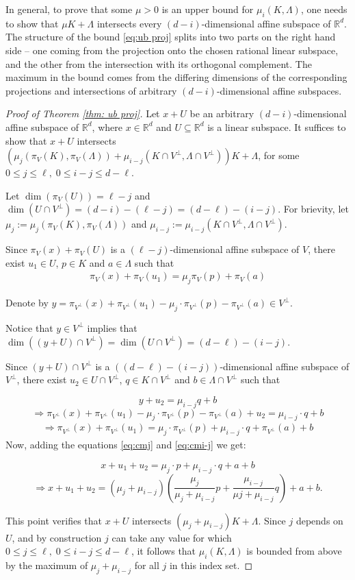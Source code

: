 \documentclass{amsart}
\theoremstyle{definition}
\theoremstyle{remark}
\newcommand{\R}{\mathbb{R}}
\begin{document}
In general, to prove that some $\mu>0$ is an upper bound for $\mu_i(K,\Lambda)$, one needs to show that $\mu K + \Lambda$ intersects every $(d-i)$-dimensional affine subspace of $\R^d$. The structure of the bound \eqref{eq:ub proj} splits into two parts on the right hand side -- one coming from the projection onto the chosen rational linear subspace, and the other from the intersection with its orthogonal complement.  The maximum in the bound comes from the differing dimensions of the corresponding projections and intersections of arbitrary $(d-i)$-dimensional affine subspaces.
\begin{proof}[Proof of Theorem \ref{thm: ub proj}]
Let $x+U$ be an arbitrary $(d-i)$-dimensional affine subspace of $\R^d$, where $x\in \R^d$ and $U\subseteq \R^d$ is a linear subspace. It suffices to show that $x+U$ intersects $(\mu_j(\pi_V(K), \pi_V(\Lambda))+ \mu_{i-j}(K\cap V^\perp, \Lambda \cap V^\perp))K + \Lambda $, for some $0 \le j \le \ell,\; 0 \le i-j \le d-\ell$.

Let $\dim(\pi_V(U))=\ell-j$ and $\dim(U\cap V^\perp)=(d-i)-(\ell-j)=(d-\ell)-(i-j)$. For brievity, let $\mu_j:=\mu_j(\pi_V(K),\pi_V(\Lambda))$ and $\mu_{i-j}:=\mu_{i-j}(K\cap V^\perp, \Lambda \cap V^\perp)$.

Since $\pi_V(x)+\pi_V(U)$ is a $(\ell-j)$-dimensional affine subspace of $V$, there exist $u_1\in U$, $p\in K$ and $a\in \Lambda$ such that 
\begin{align}\label{eq:cmj}
\pi_V(x)+\pi_V(u_1)=\mu_j \pi_V(p)+\pi_V(a)
\end{align}

Denote by $y=\pi_{V^\perp}(x)+\pi_{V^\perp}(u_1)-\mu_j\cdot \pi_{V^\perp}(p)-\pi_{V^\perp}(a)\in V^\perp$.


\noindent Notice that $y\in V^\perp$ implies that $\dim((y+U)\cap V^\perp)=\dim(U\cap V^\perp)=(d-\ell)-(i-j)$. 

\noindent Since $(y+U)\cap V^\perp$ is a $((d-\ell)-(i-j))$-dimensional affine subspace of $V^\perp$, there exist $u_2 \in U\cap V^\perp$, $q\in K\cap V^\perp$ and $b\in \Lambda \cap V^\perp$ such that

$$y+u_2=\mu_{i-j}q+b$$
$$\Rightarrow \pi_{V^\perp}(x)+\pi_{V^\perp}(u_1)-\mu_j\cdot \pi_{V^\perp}(p)-\pi_{V^\perp}(a)+u_2=\mu_{i-j}\cdot q+b$$
\begin{align}\label{eq:cmi-j}
\Rightarrow \pi_{V^\perp}(x)+\pi_{V^\perp}(u_1)=\mu_j\cdot \pi_{V^\perp}(p)+\mu_{i-j}\cdot q+\pi_{V^\perp}(a)+b
\end{align}
Now, adding the equations \ref{eq:cmj} and \ref{eq:cmi-j} we get:

$$ x+u_1+u_2=\mu_j\cdot p+\mu_{i-j}\cdot q+a+b$$
$$\Rightarrow x+u_1+u_2=(\mu_j+\mu_{i-j})\left(\frac{\mu_j}{\mu_j+\mu_{i-j}}p+\frac{\mu_{i-j}}{\mu{j}+\mu_{i-j}}q\right)+a+b.$$

This point verifies that $x+U$ intersects $(\mu_j+\mu_{i-j})K + \Lambda$. Since $j$ depends on $U$, and by construction $j$ can take any value for which $0 \le j \le \ell,\; 0 \le i-j \le d-\ell$, it follows that $\mu_i(K,\Lambda)$ is bounded from above by the maximum of $\mu_j+\mu_{i-j}$ for all $j$ in this index set. \end{proof}
\end{document}
